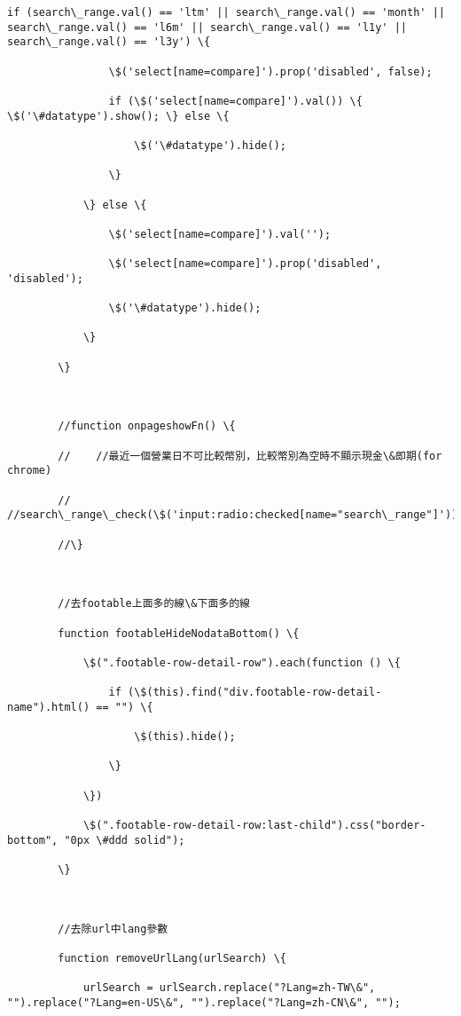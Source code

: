 \documentclass[11pt]{article}
\begin{document}
\begin{Verbatim}[commandchars=\\\{\}]
            if (search\_range.val() == 'ltm' || search\_range.val() == 'month' || search\_range.val() == 'l6m' || search\_range.val() == 'l1y' || search\_range.val() == 'l3y') \{

                \$('select[name=compare]').prop('disabled', false);

                if (\$('select[name=compare]').val()) \{ \$('\#datatype').show(); \} else \{

                    \$('\#datatype').hide();

                \}

            \} else \{

                \$('select[name=compare]').val('');

                \$('select[name=compare]').prop('disabled', 'disabled');

                \$('\#datatype').hide();

            \}

        \}



        //function onpageshowFn() \{

        //    //最近一個營業日不可比較幣別，比較幣別為空時不顯示現金\&即期(for chrome)

        //    //search\_range\_check(\$('input:radio:checked[name="search\_range"]'));

        //\}



        //去footable上面多的線\&下面多的線

        function footableHideNodataBottom() \{

            \$(".footable-row-detail-row").each(function () \{

                if (\$(this).find("div.footable-row-detail-name").html() == "") \{

                    \$(this).hide();

                \}

            \})

            \$(".footable-row-detail-row:last-child").css("border-bottom", "0px \#ddd solid");

        \}



        //去除url中lang參數

        function removeUrlLang(urlSearch) \{

            urlSearch = urlSearch.replace("?Lang=zh-TW\&", "").replace("?Lang=en-US\&", "").replace("?Lang=zh-CN\&", "");


\end{Verbatim}
\end{document}
